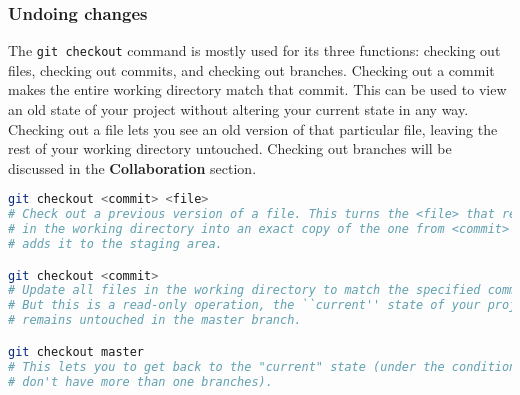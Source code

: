 \subsubsection{Undoing changes}
The \texttt{git checkout} command is mostly used for its three functions: 
checking out files, checking out commits, and checking out branches.
Checking out a commit makes the entire working directory match that commit.
This can be used to view an old state of your project without altering your current state in any way.
Checking out a file lets you see an old version of that particular file, leaving the rest of your working directory untouched.
Checking out branches will be discussed in the \textbf{Collaboration} section.
\\
\begin{lstlisting}[language=bash]
git checkout <commit> <file>
# Check out a previous version of a file. This turns the <file> that resides 
# in the working directory into an exact copy of the one from <commit> and 
# adds it to the staging area.

git checkout <commit>
# Update all files in the working directory to match the specified commit. 
# But this is a read-only operation, the ``current'' state of your project 
# remains untouched in the master branch.

git checkout master
# This lets you to get back to the "current" state (under the condition you
# don't have more than one branches).
\end{lstlisting}
